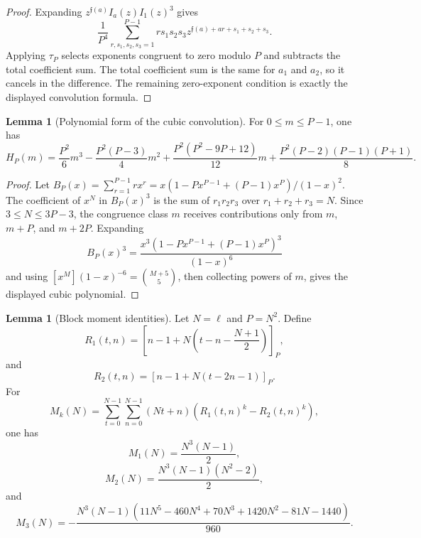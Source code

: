 \documentclass{article}
\theoremstyle{definition}
\newtheorem{lemma}[theorem]{Lemma}
\numberwithin{equation}{section}
\begin{document}
\begin{proof}
Expanding $z^{\mathfrak f(a)}I_a(z)I_1(z)^3$ gives
\begin{equation}
\frac1{P^4}\sum_{r,s_1,s_2,s_3=1}^{P-1}rs_1s_2s_3 z^{\mathfrak f(a)+ar+s_1+s_2+s_3}.
\end{equation}
Applying $\tau_P$ selects exponents congruent to zero modulo $P$ and subtracts the total coefficient sum.  The total coefficient sum is the same for $a_1$ and $a_2$, so it cancels in the difference.  The remaining zero-exponent condition is exactly the displayed convolution formula.
\end{proof}

\begin{lemma}[Polynomial form of the cubic convolution]
\label{lem:HP-polynomial-form}
For $0\leq m\leq P-1$, one has
\begin{equation}
H_P(m)=\frac{P^2}{6}m^3-\frac{P^2(P-3)}{4}m^2+\frac{P^2(P^2-9P+12)}{12}m+\frac{P^2(P-2)(P-1)(P+1)}{8}.
\end{equation}
\end{lemma}

\begin{proof}
Let $B_P(x)=\sum_{r=1}^{P-1}rx^r=x(1-Px^{P-1}+(P-1)x^P)/(1-x)^2$.  The coefficient of $x^N$ in $B_P(x)^3$ is the sum of $r_1r_2r_3$ over $r_1+r_2+r_3=N$.  Since $3\leq N\leq3P-3$, the congruence class $m$ receives contributions only from $m$, $m+P$, and $m+2P$.  Expanding
\begin{equation}
B_P(x)^3=\frac{x^3(1-Px^{P-1}+(P-1)x^P)^3}{(1-x)^6}
\end{equation}
and using $[x^M](1-x)^{-6}=\binom{M+5}{5}$, then collecting powers of $m$, gives the displayed cubic polynomial.
\end{proof}

\begin{lemma}[Block moment identities]
\label{lem:block-moment-identities}
Let $N=\ell$ and $P=N^2$.  Define
\begin{equation}
R_1(t,n)=\left[n-1+N\left(t-n-\frac{N+1}{2}\right)\right]_P,
\end{equation}
and
\begin{equation}
R_2(t,n)=\left[n-1+N(t-2n-1)\right]_P.
\end{equation}
For
\begin{equation}
M_k(N)=\sum_{t=0}^{N-1}\sum_{n=0}^{N-1}(Nt+n)\left(R_1(t,n)^k-R_2(t,n)^k\right),
\end{equation}
one has
\begin{equation}
M_1(N)=\frac{N^3(N-1)}{2},
\end{equation}
\begin{equation}
M_2(N)=\frac{N^3(N-1)(N^2-2)}{2},
\end{equation}
and
\begin{equation}
M_3(N)=-\frac{N^3(N-1)(11N^5-460N^4+70N^3+1420N^2-81N-1440)}{960}.
\end{equation}
\end{lemma}
\end{document}
